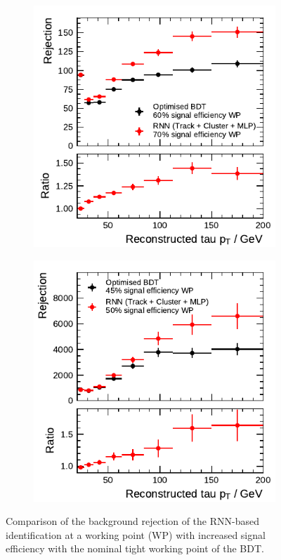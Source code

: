\begin{figure}[htbp]
  \begin{subfigure}[t]{0.48\textwidth}
    \centering
    \includegraphics{./figures/rnn/combined/rnn_loosened_tight_1p.pdf}
  \end{subfigure}\hfill
  \begin{subfigure}[t]{0.48\textwidth}
    \centering
    \includegraphics{./figures/rnn/combined/rnn_loosened_tight_3p.pdf}
  \end{subfigure}
  \caption{Comparison of the background rejection of the RNN-based
    identification at a working point (WP) with increased signal efficiency with
    the nominal tight working point of the BDT.}
  \label{fig:loosened_wp}
\end{figure}


